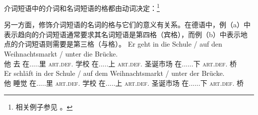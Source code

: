 介词短语中的介词和名词短语的格都由动词决定：\footnote{%
相关例子参见  。
}

\eal
{}
\zl
\largerpage
另一方面，修饰介词短语的名词的格与它们的意义有关系。在德语中，例（a）中表示趋向的介词短语通常要求其名词短语是第四格（宾格），而例（b）中表示地点的介词短语则需要是第三格（与格）。
\eal
\ex
\gll Er geht in die Schule / auf den Weihnachtsmarkt / unter die Brücke.\\
	 他 去 在.....里 \textsc{art}.\textsc{def}.\acc{} 学校 {} 在.....上 \textsc{art}.\textsc{def}.\acc{} 圣诞市场 {} 在......下 \textsc{art}.\textsc{def}.\acc{} 桥\\
\ex 
\gll Er schläft in der Schule / auf dem Weihnachtsmarkt / unter der Brücke.\\
	 他 睡觉 在.....里 \textsc{art}.\textsc{def}.\dat{} 学校 {} 在.....上 \textsc{art}.\textsc{def}.\dat{} 圣诞市场 {} 在......下 \textsc{art}.\textsc{def}.\dat{} 桥\\
\zl

